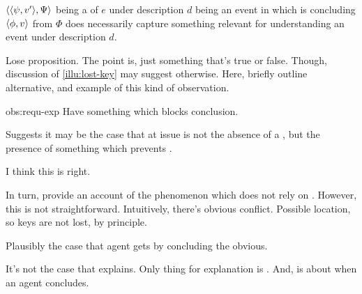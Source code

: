 \begin{note}
  \begin{observation}%
    \label{obs:requ-exp}%


    \(\langle \langle \psi, v' \rangle, \Psi \rangle\) being a \requ{} of \(e\) under description \(d\) being an event in which \vAgent{} is concluding \(\langle \phi, v \rangle\) from \(\Phi\) does necessarily capture something relevant for understanding an event under description \(d\).
  \end{observation}

  Lose proposition.
  The point is, just something that's true or false.
  Though, discussion of \autoref{illu:lost-key} may suggest otherwise.
  Here, briefly outline alternative, and example of this kind of observation.

  \begin{motivation}{obs:requ-exp}
    Have something which blocks conclusion.

    Suggests it may be the case that at issue is not the absence of a \fc{}, but the presence of something which prevents \fc{}.

    I think this is right.

    In turn, provide an account of the phenomenon which does not rely on \fc{}.
    However, this is not straightforward.
    Intuitively, there's obvious conflict.
    Possible location, so keys are not lost, by principle.

    Plausibly the case that agent gets by concluding the obvious.
  \end{motivation}

  It's not the case that \requ{} explains.
  Only thing for explanation is \qWhyV{}.
  And, \qWhyV{} is about when an agent concludes.
\end{note}

